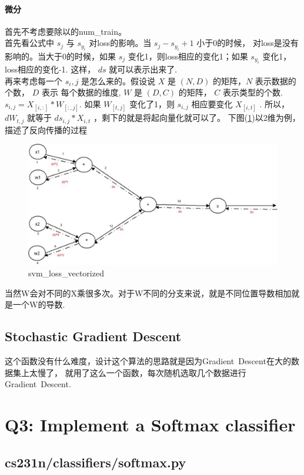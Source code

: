 \documentclass[fontset = none]{ctexart}
\begin{document}
\paragraph{微分}
首先不考虑要除以的num\_train。\\
首先看公式中 $s_j$ 与 $s_{y_i}$ 对loss的影响。当 $s_j - s_{y_i} + 1$ 小于0的时候，
对loss是没有影响的。当大于0的时候，如果 $s_j$ 变化1，则loss相应的变化1；如果 $s_{y_i}$
变化1，loss相应的变化-1. 这样， $ds$ 就可以表示出来了.\\
再来考虑每一个 $s_i,j$ 是怎么来的。假设说 $X$ 是 $(N,D)$ 的矩阵，$N$ 表示数据的个数， $D$ 表示
每个数据的维度, $W$ 是 $(D,C)$ 的矩阵， $C$ 表示类型的个数. $s_{i,j} = X_{[i,:]} * W_{[:,j]}$.
如果 $W_{[t,j]}$ 变化了1，则 $s_{i,j}$ 相应要变化 $X_{[i,t]}$ . 所以， $dW_{t,j}$ 就等于
$ds_{i,j} * X_{i,t}$ ，剩下的就是将起向量化就可以了。
下图(\ref{fig:svm_loss_vectorized})以2维为例，描述了反向传播的过程

\begin{figure}[h]
\includegraphics[width=5in]{./assignment1_pic/svm_loss_vectorized.jpg}
\caption{svm\_loss\_vectorized}
\label{fig:svm_loss_vectorized}
\end{figure}

当然W会对不同的X乘很多次。对于W不同的分支来说，就是不同位置导数相加就是一个W的导数.

\subsection{Stochastic Gradient Descent}
这个函数没有什么难度，设计这个算法的思路就是因为Gradient\ Descent在大的数据集上太慢了，
就用了这么一个函数，每次随机选取几个数据进行Gradient\ Descent.


\section{Q3: Implement a Softmax classifier}
\subsection{cs231n/classifiers/softmax.py}
\end{document}
